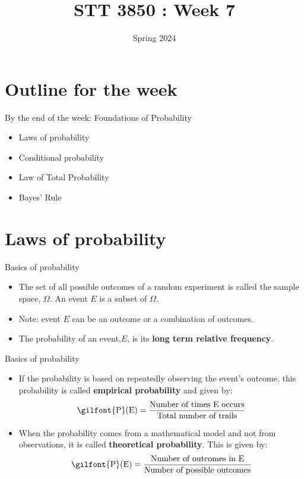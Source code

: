 \documentclass[
  ignorenonframetext,
]{beamer}
\title{STT 3850 : Week 7}
\author{Spring 2024}
\date{}
\institute{Appalachian State University}
\providecommand{\tightlist}{%
  \setlength{\itemsep}{0pt}\setlength{\parskip}{0pt}}
\begin{document}
\frame{\titlepage}

\hypertarget{outline-for-the-week}{%
\section{Outline for the week}\label{outline-for-the-week}}

\begin{frame}{By the end of the week: Foundations of Probability}
\protect\hypertarget{by-the-end-of-the-week-foundations-of-probability}{}
\begin{itemize}
\tightlist
\item
  Laws of probability
\item
  Conditional probability
\item
  Law of Total Probability
\item
  Bayes' Rule
\end{itemize}
\end{frame}

\hypertarget{laws-of-probability}{%
\section{Laws of probability}\label{laws-of-probability}}

\begin{frame}{Basics of probability}
\protect\hypertarget{basics-of-probability}{}
\begin{itemize}
\item
  The set of all possible outcomes of a random experiment is called the
  sample space, \(\Omega\). An event \(E\) is a subset of \(\Omega\).
\item
  Note: event \(E\) can be an outcome or a combination of outcomes.
\item
  The probability of an event,\(E\), is its \textbf{long term relative
  frequency}.
\end{itemize}
\end{frame}

\begin{frame}{Basics of probability}
\protect\hypertarget{basics-of-probability-1}{}
\begin{itemize}
\tightlist
\item
  If the probability is based on repeatedly observing the event's
  outcome, this probability is called \textbf{empirical probability} and
  given by:
  \[\textrm{\gilfont{P}}\normalfont (\text{E})=\frac{\text{Number of times E occurs}}{\text{Total number of trails}}\]
\item
  When the probability comes from a mathematical model and not from
  observations, it is called \textbf{theoretical probability}. This is
  given by:
  \[\textrm{\gilfont{P}}\normalfont (\text{E})=\frac{\text{Number of outcomes in E}}{\text{Number of possible outcomes}}\]
\end{itemize}
\end{frame}
\end{document}
